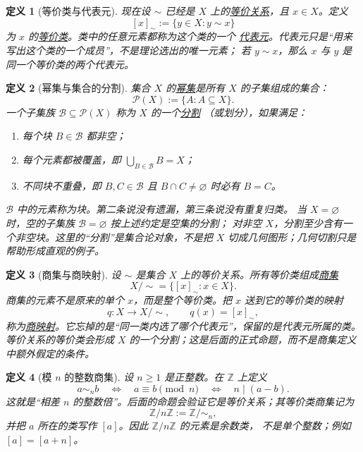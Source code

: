\documentclass[UTF8,fontset=none,a4paper,11pt]{ctexart}
\theoremstyle{foundation-definition}
\newtheorem{definition}{定义}[section]
\theoremstyle{foundation-theorem}
\theoremstyle{foundation-proposition}
\theoremstyle{foundation-example}
\theoremstyle{foundation-remark}
\theoremstyle{foundation-theorem}
\newcommand{\term}[2]{\hyperref[#1]{#2}}
\begin{document}
\begin{definition}[等价类与代表元]\label{def:equivalence-class}\label{def:representative}
现在设 \(\sim\) 已经是 \(X\) 上的\term{def:equivalence}{等价关系}，且 \(x\in X\)。定义
\[
[x]_{\sim}:=\{y\in X:y\sim x\}
\]
为 \(x\) 的\term{def:equivalence-class}{等价类}。类中的任意元素都称为这个类的一个
\term{def:representative}{代表元}。代表元只是“用来写出这个类的一个成员”，不是理论选出的唯一元素；
若 \(y\sim x\)，那么 \(x\) 与 \(y\) 是同一个等价类的两个代表元。
\end{definition}

\begin{definition}[幂集与集合的分割]\label{def:power-set}\label{def:partition}
集合 \(X\) 的\term{def:power-set}{幂集}是所有 \(X\) 的子集组成的集合：
\[
\mathcal P(X):=\{A:A\subseteq X\}.
\]
一个子集族 \(\mathcal B\subseteq\mathcal P(X)\) 称为 \(X\) 的一个\term{def:partition}{分割}
（或划分），如果满足：
\begin{enumerate}[label=(\alph*)]
  \item 每个块 \(B\in\mathcal B\) 都非空；
  \item 每个元素都被覆盖，即 \(\displaystyle\bigcup_{B\in\mathcal B}B=X\)；
  \item 不同块不重叠，即 \(B,C\in\mathcal B\) 且 \(B\cap C\ne\varnothing\) 时必有 \(B=C\)。
\end{enumerate}
\(\mathcal B\) 中的元素称为块。第二条说没有遗漏，第三条说没有重复归类。
当 \(X=\varnothing\) 时，空的子集族 \(\mathcal B=\varnothing\) 按上述约定是空集的分割；
对非空 \(X\)，分割至少含有一个非空块。这里的“分割”是集合论对象，不是把
\(X\) 切成几何图形；几何切割只是帮助形成直观的例子。
\end{definition}

\begin{definition}[商集与商映射]\label{def:quotient}\label{def:quotient-map}
设 \(\sim\) 是集合 \(X\) 上的等价关系。所有等价类组成\term{def:quotient}{商集}
\[
X/{\sim}=\{[x]_{\sim}:x\in X\}.
\]
商集的元素不是原来的单个 \(x\)，而是整个等价类。把 \(x\) 送到它的等价类的映射
\[
q:X\longrightarrow X/{\sim},\qquad q(x)=[x]_{\sim},
\]
称为\term{def:quotient-map}{商映射}。它忘掉的是“同一类内选了哪个代表元”，保留的是代表元所属的类。
等价关系的等价类会形成 \(X\) 的一个分割；这是后面的正式命题，而不是商集定义中额外假定的条件。
\end{definition}

\begin{definition}[模 \(n\) 的整数商集]\label{def:integer-quotient}
设 \(n\ge1\) 是正整数。在 \(\mathbb Z\) 上定义
\[
a\sim_n b
\quad\Longleftrightarrow\quad
a\equiv b\pmod n
\quad\Longleftrightarrow\quad
n\mid(a-b).
\]
这就是“相差 \(n\) 的整数倍”。后面的命题会验证它是等价关系；其等价类商集记为
\[
\mathbb Z/n\mathbb Z:=\mathbb Z/{\sim_n},
\]
并把 \(a\) 所在的类写作 \([a]\)。因此 \(\mathbb Z/n\mathbb Z\) 的元素是余数类，
不是单个整数；例如 \([a]=[a+n]\)。
\end{definition}
\end{document}
